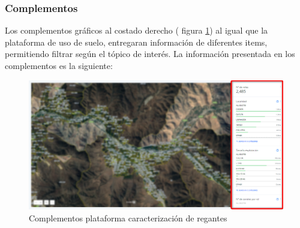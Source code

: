 \documentclass[10pt]{article}
\begin{document}
\subsubsection{Complementos}
\label{complementos}

Los complementos gráficos al costado derecho ( figura \ref{11}) al  igual que la plataforma de uso de suelo, entregaran información de diferentes items, permitiendo filtrar según el tópico de interés. La información presentada en los complementos es la siguiente:

\begin{figure}[H]
\centering
\includegraphics[scale=0.5]{Figuras_manual/widget_regantes.png}
\caption{Complementos plataforma caracterización de regantes}
\label{11}
\end{figure}
\end{document}
